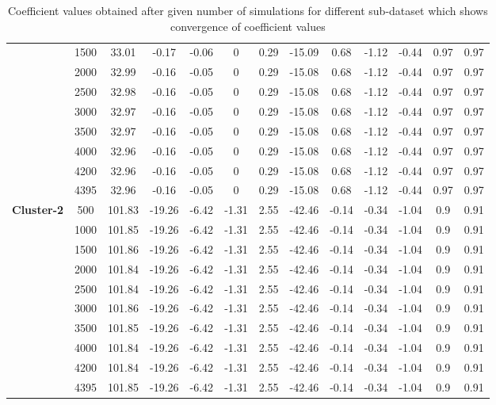 \documentclass[preprint,12pt]{elsarticle}
\begin{document}
\begin{table}[H]
\begin{tabular}{|c|c|c|c|c|c|c|c|c|c|c|c|c|}
				  		  		& 1500 & 33.01 & -0.17 & -0.06 & 0 & 0.29 & -15.09 & 0.68 & -1.12 & -0.44 & 0.97 & 0.97 \\ \cline{2-13} 
				  		  		& 2000 & 32.99 & -0.16 & -0.05 & 0 & 0.29 & -15.08 & 0.68 & -1.12 & -0.44 & 0.97 & 0.97 \\ \cline{2-13} 
				  		  		& 2500 & 32.98 & -0.16 & -0.05 & 0 & 0.29 & -15.08 & 0.68 & -1.12 & -0.44 & 0.97 & 0.97 \\ \cline{2-13} 
				  		  		& 3000 & 32.97 & -0.16 & -0.05 & 0 & 0.29 & -15.08 & 0.68 & -1.12 & -0.44 & 0.97 & 0.97 \\ \cline{2-13} 
				  		  		& 3500 & 32.97 & -0.16 & -0.05 & 0 & 0.29 & -15.08 & 0.68 & -1.12 & -0.44 & 0.97 & 0.97 \\ \cline{2-13} 
				  		  		& 4000 & 32.96 & -0.16 & -0.05 & 0 & 0.29 & -15.08 & 0.68 & -1.12 & -0.44 & 0.97 & 0.97 \\ \cline{2-13} 
				  		  		& 4200 & 32.96 & -0.16 & -0.05 & 0 & 0.29 & -15.08 & 0.68 & -1.12 & -0.44 & 0.97 & 0.97 \\ \cline{2-13} 
				  		  		& 4395 & 32.96 & -0.16 & -0.05 & 0 & 0.29 & -15.08 & 0.68 & -1.12 & -0.44 & 0.97 & 0.97 \\ \hline
				  		  		\multirow{10}{*}{\textbf{Cluster-2}} & 500 & 101.83 & -19.26 & -6.42 & -1.31 & 2.55 & -42.46 & -0.14 & -0.34 & -1.04 & 0.9 & 0.91 \\ \cline{2-13} 
				  		  		& 1000 & 101.85 & -19.26 & -6.42 & -1.31 & 2.55 & -42.46 & -0.14 & -0.34 & -1.04 & 0.9 & 0.91 \\ \cline{2-13} 
				  		  		& 1500 & 101.86 & -19.26 & -6.42 & -1.31 & 2.55 & -42.46 & -0.14 & -0.34 & -1.04 & 0.9 & 0.91 \\ \cline{2-13} 
				  		  		& 2000 & 101.84 & -19.26 & -6.42 & -1.31 & 2.55 & -42.46 & -0.14 & -0.34 & -1.04 & 0.9 & 0.91 \\ \cline{2-13} 
				  		  		& 2500 & 101.84 & -19.26 & -6.42 & -1.31 & 2.55 & -42.46 & -0.14 & -0.34 & -1.04 & 0.9 & 0.91 \\ \cline{2-13} 
				  		  		& 3000 & 101.86 & -19.26 & -6.42 & -1.31 & 2.55 & -42.46 & -0.14 & -0.34 & -1.04 & 0.9 & 0.91 \\ \cline{2-13} 
				  		  		& 3500 & 101.85 & -19.26 & -6.42 & -1.31 & 2.55 & -42.46 & -0.14 & -0.34 & -1.04 & 0.9 & 0.91 \\ \cline{2-13} 
				  		  		& 4000 & 101.84 & -19.26 & -6.42 & -1.31 & 2.55 & -42.46 & -0.14 & -0.34 & -1.04 & 0.9 & 0.91 \\ \cline{2-13} 
				  		  		& 4200 & 101.84 & -19.26 & -6.42 & -1.31 & 2.55 & -42.46 & -0.14 & -0.34 & -1.04 & 0.9 & 0.91 \\ \cline{2-13} 
				  		  		& 4395 & 101.85 & -19.26 & -6.42 & -1.31 & 2.55 & -42.46 & -0.14 & -0.34 & -1.04 & 0.9 & 0.91 \\ \hline
				  		  	\end{tabular}
				  		  	\vspace{0.25cm}
				  		  	\caption{Coefficient values obtained after given number of simulations for different sub-dataset which shows convergence of coefficient values}
				  		  	\label{table:converge}
				  		  \end{table}				  		  
\end{document}
